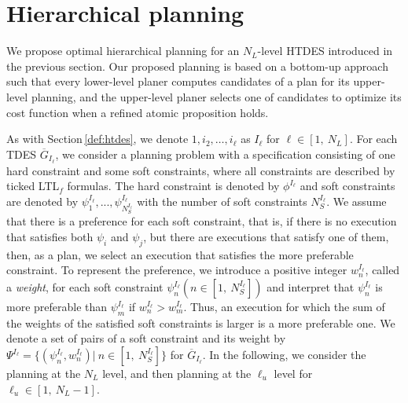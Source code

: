 \documentclass{article}
\newcommand{\rsec}[1]{Section\,\ref{#1}}
\begin{document}
%
\section{Hierarchical planning}\label{sec:hplan}
%


We propose optimal hierarchical planning for an $N_L$-level HTDES introduced in the previous section.
Our proposed planning is based on a bottom-up approach such that every lower-level planer computes candidates of a plan for its upper-level planning, and the upper-level planer selects one of candidates to optimize its cost function when a refined atomic proposition holds.

As with \rsec{def:htdes}, we denote $1,i_2,\ldots,i_\ell$ as ${I_{\ell}}$ for $\ell\in[1,~N_L]$.
For each TDES $\overline{G}_{I_{\ell}}$, we consider a planning problem with a specification consisting of one hard constraint and some soft constraints, where all constraints are described by ticked LTL$_f$ formulas. 
The hard constraint is denoted by $\phi^{I_{\ell}}$ and soft constraints are denoted by $\psi_1^{I_{\ell}},...,\psi_{N^{I_{\ell}}_S}^{I_{\ell}}$ with the number of soft constraints $N^{I_{\ell}}_S$. 
We assume that there is a preference for each soft constraint, that is, if there is no execution that satisfies both $\psi_i$ and $\psi_j$, but there are executions that satisfy one of them, then, as a plan, we select an execution that satisfies the more preferable constraint.  
To represent the preference, we introduce a positive integer $w_n^{I_{\ell}}$, called a \textit{weight}, for each soft constraint $\psi_n^{I_{\ell}} (n \in [1,~N^{I_{\ell}}_S])$ and interpret that $\psi_n^{I_{\ell}}$ is more preferable than $\psi_m^{I_{\ell}}$ if $w_n^{I_{\ell}} >w_m^{I_{\ell}}$. 
Thus, an execution for which the sum of the weights of the satisfied soft constraints is larger is a more preferable one.
We denote a set of pairs of a soft constraint and its weight by $\Psi^{I_{\ell}}=\{(\psi_n^{I_{\ell}}, w_n^{I_{\ell}})|~n\in[1,~N^{I_{\ell}}_S]\}$ for $\overline{G}_{I_{\ell}}$.
In the following, we consider the planning at the $N_L$ level, and then planning at the $\ell_u$ level for $\ell_u\in[1,~N_L-1]$.
%
\end{document}

